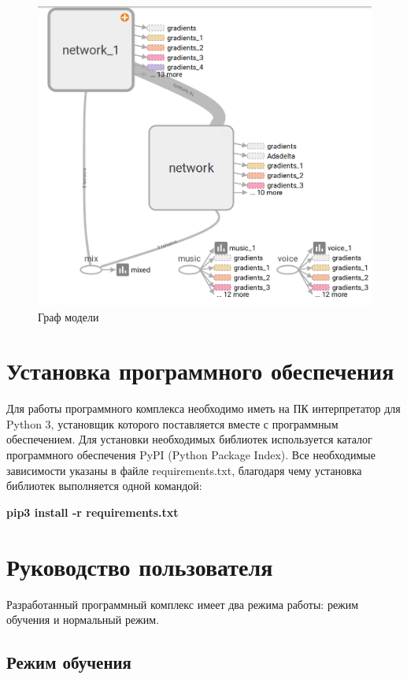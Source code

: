 \begin{figure}
	\centering
	\includegraphics[width=\textwidth]{inc/img/tensorboard-main}
	\caption{Граф модели}
	\label{imp:graph}
\end{figure}

\section{Установка программного обеспечения}

Для работы программного комплекса необходимо иметь на ПК интерпретатор для Python 3, установщик которого поставляется вместе с программным обеспечением. Для установки необходимых библиотек используется каталог программного обеспечения PyPI (Python Package Index). Все необходимые зависимости указаны в файле requirements.txt, благодаря чему установка библиотек выполняется одной командой:

\textbf{pip3 install -r requirements.txt}

\section{Руководство пользователя}

Разработанный программный комплекс имеет два режима работы: режим обучения и нормальный режим.

\subsection{Режим обучения}

